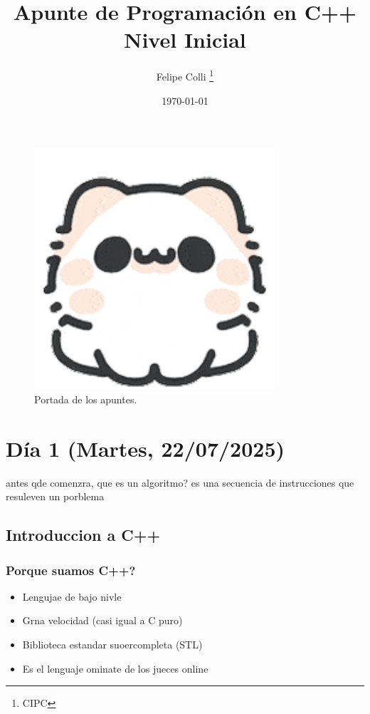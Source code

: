 \documentclass[11pt]{article}
\title{Apunte de Programación en C++ \\ Nivel Inicial}
\author{Felipe Colli \thanks{CIPC}}
\date{\today}
\begin{document}
\maketitle

\begin{figure}[htbp]
    \centering
    \includegraphics[width=0.8\textwidth]{gatito}
    \caption{Portada de los apuntes.} %
\end{figure}

\newpage
\tableofcontents %
\newpage


\section{Día 1 (Martes, 22/07/2025)}
antes qde comenzra, que es un algoritmo?
es una secuencia de instrucciones que resuleven un porblema
\subsection{Introduccion a C++}
\subsubsection{Porque suamos C++?}
\begin{itemize}
    \item Lengujae de bajo nivle
    \item Grna velocidad (casi igual a C puro)
    \item Biblioteca estandar suoercompleta (STL)
    \item Es el lenguaje ominate de los jueces online
\end{itemize}
\end{document}
